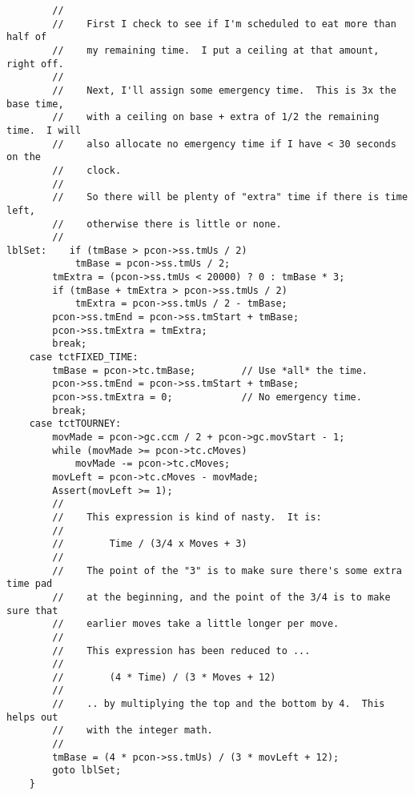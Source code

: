 \documentclass[10pt,dvipdfmx,letterpaper]{report}
\begin{document}
{\begin{verbatim}
        //
        //    First I check to see if I'm scheduled to eat more than half of
        //    my remaining time.  I put a ceiling at that amount, right off.
        //
        //    Next, I'll assign some emergency time.  This is 3x the base time,
        //    with a ceiling on base + extra of 1/2 the remaining time.  I will
        //    also allocate no emergency time if I have < 30 seconds on the
        //    clock.
        //
        //    So there will be plenty of "extra" time if there is time left,
        //    otherwise there is little or none.
        //
lblSet:    if (tmBase > pcon->ss.tmUs / 2)
            tmBase = pcon->ss.tmUs / 2;
        tmExtra = (pcon->ss.tmUs < 20000) ? 0 : tmBase * 3;
        if (tmBase + tmExtra > pcon->ss.tmUs / 2)
            tmExtra = pcon->ss.tmUs / 2 - tmBase;
        pcon->ss.tmEnd = pcon->ss.tmStart + tmBase;
        pcon->ss.tmExtra = tmExtra;
        break;
    case tctFIXED_TIME:
        tmBase = pcon->tc.tmBase;        // Use *all* the time.
        pcon->ss.tmEnd = pcon->ss.tmStart + tmBase;
        pcon->ss.tmExtra = 0;            // No emergency time.
        break;
    case tctTOURNEY:
        movMade = pcon->gc.ccm / 2 + pcon->gc.movStart - 1;
        while (movMade >= pcon->tc.cMoves)
            movMade -= pcon->tc.cMoves;
        movLeft = pcon->tc.cMoves - movMade;
        Assert(movLeft >= 1);
        //
        //    This expression is kind of nasty.  It is:
        //
        //        Time / (3/4 x Moves + 3)
        //
        //    The point of the "3" is to make sure there's some extra time pad
        //    at the beginning, and the point of the 3/4 is to make sure that
        //    earlier moves take a little longer per move.
        //
        //    This expression has been reduced to ...
        //
        //        (4 * Time) / (3 * Moves + 12)
        //
        //    .. by multiplying the top and the bottom by 4.  This helps out
        //    with the integer math.
        //
        tmBase = (4 * pcon->ss.tmUs) / (3 * movLeft + 12);
        goto lblSet;
    }
\end{verbatim}
}
\end{document}

